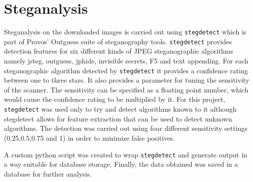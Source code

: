 \section {Steganalysis}
\label{sec:stegtool}
Steganalysis on the downloaded images is carried out using \texttt{stegdetect} which is part of Provos' Outguess suite of steganography tools. \texttt{stegdetect} provides detection features for six different kinds of JPEG steganographic algorithms namely jsteg, outguess, jphide, invisible secrets, F5 and text appending. For each steganographic algorithm detected by \texttt{stegdetect} it provides a confidence rating between one to three stars. It also provides a parameter for tuning the sensitivity of the scanner. The sensitivity can be specified as a floating point number, which would cause the confidence rating to be multiplied by it. For this project, \texttt{stegdetect} was used only to try and detect algorithms known to it although stegdetect allows for feature extraction that can be used to detect unknown algorithms. The detection was carried out using four different sensitivity settings (0.25,0.5,0.75 and 1) in order to minimize false positives.
\par A custom python script was created to wrap \texttt{stegdetect} and generate output in a way suitable for database storage. Finally, the data obtained was saved in a database for further analysis.


